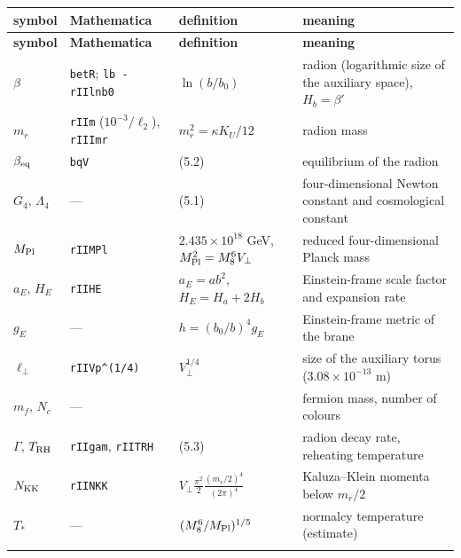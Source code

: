 \documentclass[10pt,a4paper]{article}
\begin{document}
{\small
\begin{longtable}{>{\raggedright\arraybackslash}p{}>{\raggedright\arraybackslash}p{}>{\raggedright\arraybackslash}p{}>{\raggedright\arraybackslash}p{}}
\toprule
\textbf{symbol} & \textbf{Mathematica} & \textbf{definition} & \textbf{meaning} \\
\midrule\endfirsthead
\toprule
\textbf{symbol} & \textbf{Mathematica} & \textbf{definition} & \textbf{meaning} \\
\midrule\endhead
\endfoot
\bottomrule\endlastfoot
$\beta$ & \texttt{betR}; \texttt{lb - rIIlnb0} & $\ln(b/b_0)$ & radion (logarithmic size of the auxiliary space), $H_b=\beta'$ \\
$m_r$ & \texttt{rIIm} ($10^{-3}/\ell_2$), \texttt{rIIImr} & $m_r^2=\kappa K_U/12$ & radion mass \\
$\beta_{\rm eq}$ & \texttt{bqV} & (5.2) & equilibrium of the radion \\
$G_4$, $\Lambda_4$ & — & (5.1) & four-dimensional Newton constant and cosmological constant \\
$M_{\rm Pl}$ & \texttt{rIIMPl} & $2.435\times10^{18}$ GeV, $M_{\rm Pl}^2=M_8^6V_\perp$ & reduced four-dimensional Planck mass \\
$a_E$, $H_E$ & \texttt{rIIHE} & $a_E=ab^2$, $H_E=H_a+2H_b$ & Einstein-frame scale factor and expansion rate \\
$g_E$ & — & $h=(b_0/b)^4g_E$ & Einstein-frame metric of the brane \\
$\ell_\perp$ & \texttt{rIIVp\textasciicircum{}(1/\allowbreak{}4)} & $V_\perp^{1/4}$ & size of the auxiliary torus ($3.08\times10^{-13}$ m) \\
$m_f$, $N_c$ & — &  & fermion mass, number of colours \\
$\Gamma$, $T_{\rm RH}$ & \texttt{rIIgam}, \texttt{rIITRH} & (5.3) & radion decay rate, reheating temperature \\
$N_{\rm KK}$ & \texttt{rIINKK} & $V_\perp\frac{\pi^2}2\frac{(m_r/2)^4}{(2\pi)^4}$ & Kaluza–Klein momenta below $m_r/2$ \\
$T_*$ & — & $(M_8^6/M_{\rm Pl})^{1/5}$ & normalcy temperature (estimate) \\*
\end{longtable}}
\end{document}
